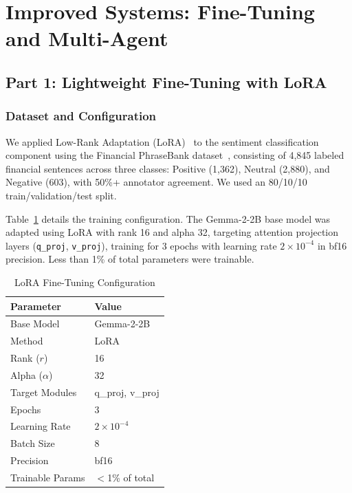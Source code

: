 \documentclass[conference]{IEEEtran}
\begin{document}
\section{Improved Systems: Fine-Tuning and Multi-Agent}
\label{sec:improved}

\subsection{Part 1: Lightweight Fine-Tuning with LoRA}

\subsubsection{Dataset and Configuration}

We applied Low-Rank Adaptation (LoRA)~\cite{hu2021lora} to the sentiment classification component using the Financial PhraseBank dataset~\cite{malo2014financial}, consisting of 4,845 labeled financial sentences across three classes: Positive (1,362), Neutral (2,880), and Negative (603), with 50\%+ annotator agreement. We used an 80/10/10 train/validation/test split.

Table~\ref{tab:lora_config} details the training configuration. The Gemma-2-2B base model was adapted using LoRA with rank 16 and alpha 32, targeting attention projection layers (\texttt{q\_proj}, \texttt{v\_proj}), training for 3 epochs with learning rate $2 \times 10^{-4}$ in bf16 precision. Less than 1\% of total parameters were trainable.

\begin{table}[htbp]
\caption{LoRA Fine-Tuning Configuration}
\label{tab:lora_config}
\centering
\small
\begin{tabular}{@{}ll@{}}
\toprule
\textbf{Parameter} & \textbf{Value} \\
\midrule
Base Model & Gemma-2-2B \\
Method & LoRA \\
Rank ($r$) & 16 \\
Alpha ($\alpha$) & 32 \\
Target Modules & q\_proj, v\_proj \\
Epochs & 3 \\
Learning Rate & $2 \times 10^{-4}$ \\
Batch Size & 8 \\
Precision & bf16 \\
Trainable Params & $<$1\% of total \\
\bottomrule
\end{tabular}
\end{table}
\end{document}
